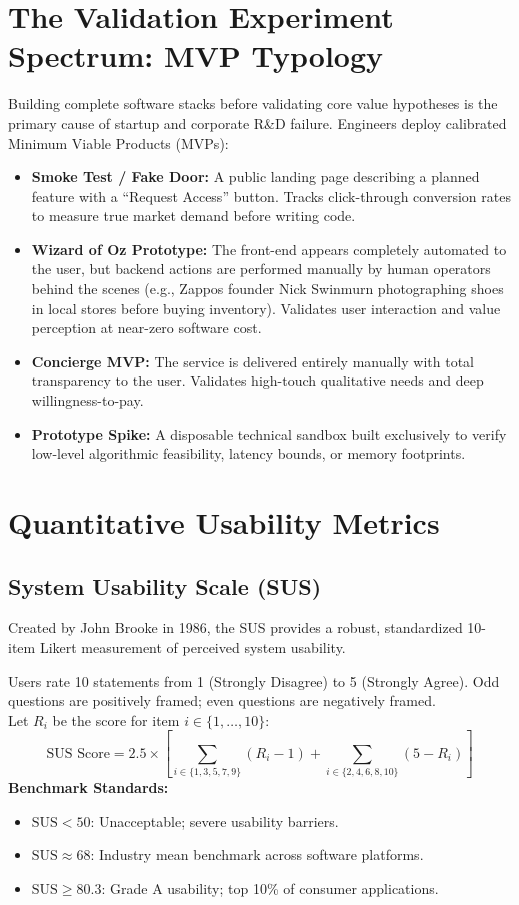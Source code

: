 \section{The Validation Experiment Spectrum: MVP Typology}
Building complete software stacks before validating core value hypotheses is the primary cause of startup and corporate R\&D failure. Engineers deploy calibrated Minimum Viable Products (MVPs):
\begin{itemize}
    \item \textbf{Smoke Test / Fake Door:} A public landing page describing a planned feature with a ``Request Access'' button. Tracks click-through conversion rates to measure true market demand before writing code.
    \item \textbf{Wizard of Oz Prototype:} The front-end appears completely automated to the user, but backend actions are performed manually by human operators behind the scenes (e.g., Zappos founder Nick Swinmurn photographing shoes in local stores before buying inventory). Validates user interaction and value perception at near-zero software cost.
    \item \textbf{Concierge MVP:} The service is delivered entirely manually with total transparency to the user. Validates high-touch qualitative needs and deep willingness-to-pay.
    \item \textbf{Prototype Spike:} A disposable technical sandbox built exclusively to verify low-level algorithmic feasibility, latency bounds, or memory footprints.
\end{itemize}

\section{Quantitative Usability Metrics}

\subsection{System Usability Scale (SUS)}
Created by John Brooke in 1986, the SUS provides a robust, standardized 10-item Likert measurement of perceived system usability.
\begin{methodbox}
Users rate 10 statements from 1 (Strongly Disagree) to 5 (Strongly Agree). Odd questions are positively framed; even questions are negatively framed.\\
Let $R_i$ be the score for item $i \in \{1, \dots, 10\}$:
\[
\text{SUS Score} = 2.5 \times \left[ \sum_{i \in \{1,3,5,7,9\}} (R_i - 1) + \sum_{i \in \{2,4,6,8,10\}} (5 - R_i) \right]
\]
\textbf{Benchmark Standards:}
\begin{itemize}
    \item $\text{SUS} < 50$: Unacceptable; severe usability barriers.
    \item $\text{SUS} \approx 68$: Industry mean benchmark across software platforms.
    \item $\text{SUS} \ge 80.3$: Grade A usability; top 10\% of consumer applications.
\end{itemize}
\end{methodbox}

